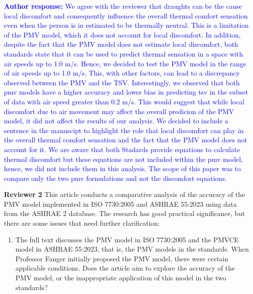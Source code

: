 \documentclass[a4paper, 10pt]{letter}
\newcommand{\response}[1]{\textcolor{blue}{\textbf{Author response:} #1}}
\begin{document}
\begin{letter}
\begin{enumerate}
            \response{
                We agree with the reviewer that draughts can be the cause local discomfort and consequently influence the overall thermal comfort sensation even when the person is in estimated to be thermally neutral.
                This is a limitation of the PMV model, which it does not account for local discomfort.
                In addition, despite the fact that the PMV model does not estimate local discomfort, both standards state that it can be used to predict thermal sensation in a space with air speeds up to 1.0 m/s.
                Hence, we decided to test the PMV model in the range of air speeds up to 1.0 m/s.
                This, with other factors, can lead to a discrepancy observed between the PMV and the TSV.
                Interestingly, we observed that both \ac{pmv} models have a higher accuracy and lower bias in predicting \ac{tsv} in the subset of data with air speed greater than 0.2 m/s.
                This would suggest that while local discomfort due to air movement may affect the overall predicion of the PMV model, it did not affect the results of our analysis.
                We decided to include a sentence in the manuscipt to highlight the role that local discomfort can play in the overall thermal comfort sensation and the fact that the PMV model does not account for it.
                We are aware that both Stadards provide equations to calculate thermal discomfort but these equations are not included within the \ac{pmv} model, hence, we did not include them in this analysis.
                The scope of this paper was to compare only the two \ac{pmv} formulations and not the discomfort equations.
            }

        \end{enumerate}

        \textbf{Reviewer 2}
        This article conducts a comparative analysis of the accuracy of the PMV model implemented in ISO 7730:2005 and ASHRAE 55:2023 using data from the ASHRAE 2 database.
        The research has good practical significance, but there are some issues that need further clarification:

        \begin{enumerate}
            \item The full text discusses the PMV model in ISO 7730:2005 and the PMVCE model in ASHRAE 55:2023, that is, the PMV models in the standards.
            When Professor Fanger initially proposed the PMV model, there were certain applicable conditions.
            Does the article aim to explore the accuracy of the PMV model, or the inappropriate application of this model in the two standards?


\end{enumerate}
\end{letter}
\end{document}
